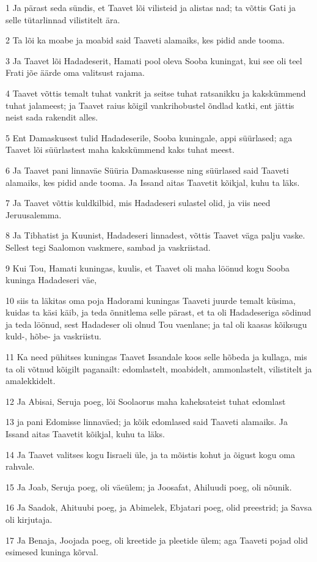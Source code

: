\par 1 Ja pärast seda sündis, et Taavet lõi vilisteid ja alistas nad; ta võttis Gati ja selle tütarlinnad vilistitelt ära.
\par 2 Ta lõi ka moabe ja moabid said Taaveti alamaiks, kes pidid ande tooma.
\par 3 Ja Taavet lõi Hadadeserit, Hamati pool oleva Sooba kuningat, kui see oli teel Frati jõe äärde oma valitsust rajama.
\par 4 Taavet võttis temalt tuhat vankrit ja seitse tuhat ratsanikku ja kakskümmend tuhat jalameest; ja Taavet raius kõigil vankrihobustel õndlad katki, ent jättis neist sada rakendit alles.
\par 5 Ent Damaskusest tulid Hadadeserile, Sooba kuningale, appi süürlased; aga Taavet lõi süürlastest maha kakskümmend kaks tuhat meest.
\par 6 Ja Taavet pani linnaväe Süüria Damaskusesse ning süürlased said Taaveti alamaiks, kes pidid ande tooma. Ja Issand aitas Taavetit kõikjal, kuhu ta läks.
\par 7 Ja Taavet võttis kuldkilbid, mis Hadadeseri sulastel olid, ja viis need Jeruusalemma.
\par 8 Ja Tibhatist ja Kuunist, Hadadeseri linnadest, võttis Taavet väga palju vaske. Sellest tegi Saalomon vaskmere, sambad ja vaskriistad.
\par 9 Kui Tou, Hamati kuningas, kuulis, et Taavet oli maha löönud kogu Sooba kuninga Hadadeseri väe,
\par 10 siis ta läkitas oma poja Hadorami kuningas Taaveti juurde temalt küsima, kuidas ta käsi käib, ja teda õnnitlema selle pärast, et ta oli Hadadeseriga sõdinud ja teda löönud, sest Hadadeser oli olnud Tou vaenlane; ja tal oli kaasas kõiksugu kuld-, hõbe- ja vaskriistu.
\par 11 Ka need pühitses kuningas Taavet Issandale koos selle hõbeda ja kullaga, mis ta oli võtnud kõigilt paganailt: edomlastelt, moabidelt, ammonlastelt, vilistitelt ja amalekkidelt.
\par 12 Ja Abisai, Seruja poeg, lõi Soolaorus maha kaheksateist tuhat edomlast
\par 13 ja pani Edomisse linnaväed; ja kõik edomlased said Taaveti alamaiks. Ja Issand aitas Taavetit kõikjal, kuhu ta läks.
\par 14 Ja Taavet valitses kogu Iisraeli üle, ja ta mõistis kohut ja õigust kogu oma rahvale.
\par 15 Ja Joab, Seruja poeg, oli väeülem; ja Joosafat, Ahiluudi poeg, oli nõunik.
\par 16 Ja Saadok, Ahituubi poeg, ja Abimelek, Ebjatari poeg, olid preestrid; ja Savsa oli kirjutaja.
\par 17 Ja Benaja, Joojada poeg, oli kreetide ja pleetide ülem; aga Taaveti pojad olid esimesed kuninga kõrval.

